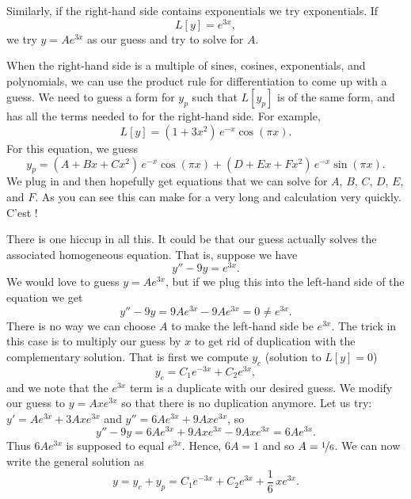 Similarly, if the right-hand side contains exponentials we try
exponentials.  If
\begin{equation*}
L[y] = e^{3x},
\end{equation*}
we try $y = A e^{3x}$ as our guess and try to solve for $A$.

\medskip

When the right-hand side is a multiple of sines, cosines, exponentials,
and polynomials, we can use the product rule
for differentiation to come up with a guess.  We
need to guess a
form for $y_p$ such that $L[y_p]$ is of the same form, and 
has all the terms needed to for 
the right-hand side.
For example,
\begin{equation*}
L[y] = (1+3x^2)\,e^{-x}\cos (\pi x) .
\end{equation*}
For this equation, we guess
\begin{equation*}
y_p = (A + Bx + Cx^2)\,e^{-x} \cos (\pi x) + 
(D + Ex + Fx^2)\,e^{-x} \sin (\pi x) .
\end{equation*}
We plug in and then hopefully get equations that we can solve for
$A$, $B$, $C$, $D$, $E$, and $F$.
As you can see this can make for a very long and
calculation very quickly.  C'est ! %

\medskip

There is one hiccup in all this.  It could be that our guess actually
solves the associated homogeneous equation.  That is, suppose we have
\begin{equation*}
y'' - 9y = e^{3x} .
\end{equation*}
We would love to guess $y = Ae^{3x}$, but if we plug this into the
left-hand side of the equation we get
\begin{equation*}
y''-9y = 9Ae^{3x} - 9Ae^{3x} = 0 \not= e^{3x} .
\end{equation*}
There is no way we can choose $A$ to make the left-hand side be $e^{3x}$.
The trick in
this case
is to multiply our guess by $x$ to get rid of duplication with the
complementary solution.  That is first we compute $y_c$ (solution to $L[y] =
0$)
\begin{equation*}
y_c = C_1 e^{-3x} + C_2 e^{3x} ,
\end{equation*}
and we note that the $e^{3x}$ term is a duplicate with our desired guess.
We modify our guess to $y = Axe^{3x}$ so that there is no
duplication anymore.  Let us try:
$y' = Ae^{3x} + 3Axe^{3x}$ and 
$y'' = 6Ae^{3x} + 9Axe^{3x}$, so
\begin{equation*}
y'' -9y = 6Ae^{3x} + 9Axe^{3x} - 9Axe^{3x} = 
6Ae^{3x} .
\end{equation*}
Thus $6Ae^{3x}$ is supposed to equal $e^{3x}$.  Hence,
$6A = 1$ and so $A=\nicefrac{1}{6}$.  We can now write the general
solution as
\begin{equation*}
y = y_c + y_p = 
C_1 e^{-3x} + C_2 e^{3x} + \frac{1}{6}\,xe^{3x} .
\end{equation*}


